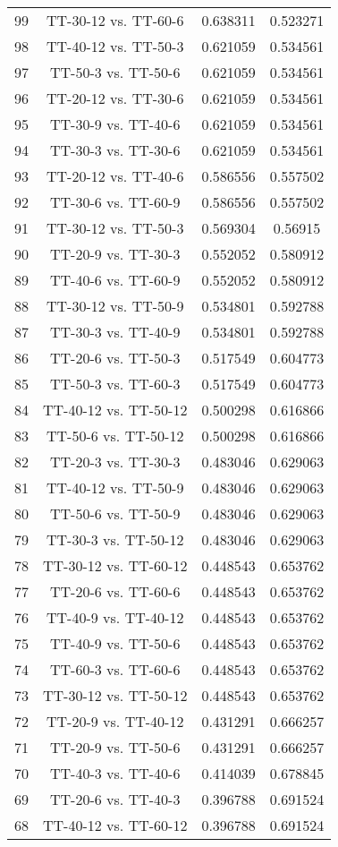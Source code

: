 \documentclass[a4paper,10pt]{article}
\begin{document}
\begin{landscape}
\begin{table}[!htp]
\begin{tabular}{cccc}
99&TT-30-12 vs. TT-60-6&0.638311&0.523271\\
98&TT-40-12 vs. TT-50-3&0.621059&0.534561\\
97&TT-50-3 vs. TT-50-6&0.621059&0.534561\\
96&TT-20-12 vs. TT-30-6&0.621059&0.534561\\
95&TT-30-9 vs. TT-40-6&0.621059&0.534561\\
94&TT-30-3 vs. TT-30-6&0.621059&0.534561\\
93&TT-20-12 vs. TT-40-6&0.586556&0.557502\\
92&TT-30-6 vs. TT-60-9&0.586556&0.557502\\
91&TT-30-12 vs. TT-50-3&0.569304&0.56915\\
90&TT-20-9 vs. TT-30-3&0.552052&0.580912\\
89&TT-40-6 vs. TT-60-9&0.552052&0.580912\\
88&TT-30-12 vs. TT-50-9&0.534801&0.592788\\
87&TT-30-3 vs. TT-40-9&0.534801&0.592788\\
86&TT-20-6 vs. TT-50-3&0.517549&0.604773\\
85&TT-50-3 vs. TT-60-3&0.517549&0.604773\\
84&TT-40-12 vs. TT-50-12&0.500298&0.616866\\
83&TT-50-6 vs. TT-50-12&0.500298&0.616866\\
82&TT-20-3 vs. TT-30-3&0.483046&0.629063\\
81&TT-40-12 vs. TT-50-9&0.483046&0.629063\\
80&TT-50-6 vs. TT-50-9&0.483046&0.629063\\
79&TT-30-3 vs. TT-50-12&0.483046&0.629063\\
78&TT-30-12 vs. TT-60-12&0.448543&0.653762\\
77&TT-20-6 vs. TT-60-6&0.448543&0.653762\\
76&TT-40-9 vs. TT-40-12&0.448543&0.653762\\
75&TT-40-9 vs. TT-50-6&0.448543&0.653762\\
74&TT-60-3 vs. TT-60-6&0.448543&0.653762\\
73&TT-30-12 vs. TT-50-12&0.448543&0.653762\\
72&TT-20-9 vs. TT-40-12&0.431291&0.666257\\
71&TT-20-9 vs. TT-50-6&0.431291&0.666257\\
70&TT-40-3 vs. TT-40-6&0.414039&0.678845\\
69&TT-20-6 vs. TT-40-3&0.396788&0.691524\\
68&TT-40-12 vs. TT-60-12&0.396788&0.691524\\

\end{tabular}
\end{table}
\end{landscape}
\end{document}
